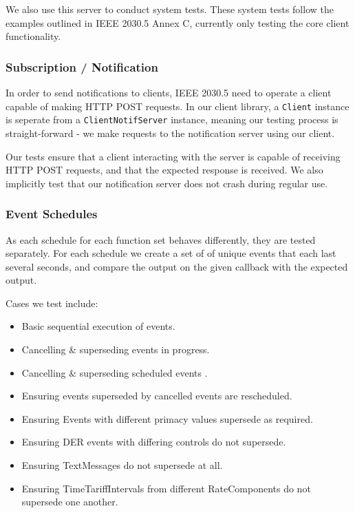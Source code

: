 We also use this server to conduct system tests. These system tests follow the examples outlined in IEEE 2030.5 Annex C, currently only testing the core client functionality.

\subsubsection{Subscription / Notification}
In order to send notifications to clients, IEEE 2030.5 need to operate a client capable of making HTTP POST requests. In our client library, a \texttt{Client} instance is seperate from a \texttt{ClientNotifServer} instance, meaning our testing process is straight-forward - we make requests to the notification server using our client. 

Our tests ensure that a client interacting with the server is capable of receiving HTTP POST requests, and that the expected response is received. We also implicitly test that our notification server does not crash during regular use.

\subsubsection{Event Schedules}
As each schedule for each function set behaves differently, they are tested separately. For each schedule we create a set of of unique events that each last several seconds, and compare the output on the given callback with the expected output. 

Cases we test include:

\begin{itemize}
    \item Basic sequential execution of events.
    \item Cancelling \& superseding events in progress.
    \item Cancelling \& superseding scheduled events .
    \item Ensuring events superseded by cancelled events are rescheduled.
    \item Ensuring Events with different primacy values supersede as required.
    \item Ensuring DER events with differing controls do not supersede.
    \item Ensuring TextMessages do not supersede at all.
    \item Ensuring TimeTariffIntervals from different RateComponents do not supersede one another.
\end{itemize}

